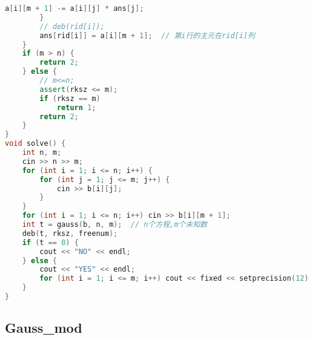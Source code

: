 \begin{lstlisting}[language=C++]
            a[i][m + 1] -= a[i][j] * ans[j];
        }
        // deb(rid[i]);
        ans[rid[i]] = a[i][m + 1];  // 第i行的主元在rid[i]列
    }
    if (m > n) {
        return 2;
    } else {
        // m<=n;
        assert(rksz <= m);
        if (rksz == m)
            return 1;
        return 2;
    }
}
void solve() {
    int n, m;
    cin >> n >> m;
    for (int i = 1; i <= n; i++) {
        for (int j = 1; j <= m; j++) {
            cin >> b[i][j];
        }
    }
    for (int i = 1; i <= n; i++) cin >> b[i][m + 1];
    int t = gauss(b, n, m);  // n个方程,m个未知数
    deb(t, rksz, freenum);
    if (t == 0) {
        cout << "NO" << endl;
    } else {
        cout << "YES" << endl;
        for (int i = 1; i <= m; i++) cout << fixed << setprecision(12) << ans[i] << endl;
    }
}
\end{lstlisting}
\subsection{Gauss\_mod}
